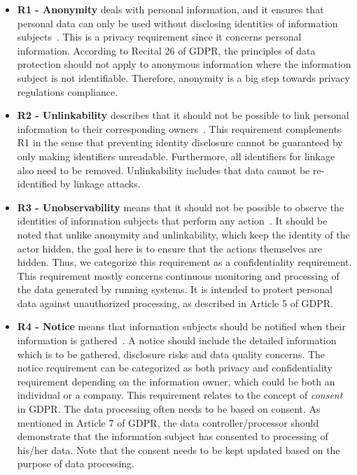\documentclass[manuscript]{acmart}
\begin{document}
\begin{itemize}
   \item \textbf{R1 - Anonymity} deals with personal information, and it ensures that personal data can only be used without disclosing identities of information subjects~\cite{teminology_2006_dritsas,PfitzmannK00}. This is a privacy requirement since it concerns personal information. According to Recital 26 of GDPR, the principles of data protection should not apply to anonymous information where the information subject is not identifiable. Therefore, anonymity is a big step towards privacy regulations compliance.  
   \item \textbf{R2 - Unlinkability} describes that it should not be possible to link personal information to their corresponding owners~\cite{PfitzmannK00}. This requirement complements R1 in the sense that preventing identity disclosure cannot be guaranteed by only making identifiers unreadable. Furthermore, all identifiers for linkage also need to be removed. Unlinkability includes that data cannot be re-identified by linkage attacks.    
   \item \textbf{R3 - Unobservability} means that it should not be possible to observe the identities of information subjects that perform any action~\cite{PfitzmannK00}. It should be noted that unlike anonymity and unlinkability, which keep the identity of the actor hidden, the goal here is to ensure that the actions themselves are hidden. Thus, we categorize this requirement as a confidentiality requirement. This requirement mostly concerns continuous monitoring and processing of the data generated by running systems. It is intended to protect personal data against unauthorized processing, as described in Article 5 of GDPR.     
   \item \textbf{R4 - Notice} means that information subjects should be notified when their information is gathered~\cite{teminology_2006_dritsas}. A notice should include the detailed information which is to be gathered, disclosure risks and data quality concerns. The notice requirement can be categorized as both privacy and confidentiality requirement depending on the information owner, which could be both an individual or a company. This requirement relates to the concept of \textit{consent} in GDPR. The data processing often needs to be based on consent. As mentioned in Article 7 of GDPR, the data controller/processor should demonstrate that the information subject has consented to processing of his/her data. Note that the consent needs to be kept updated based on the purpose of data processing.   

\end{itemize}
\end{document}

